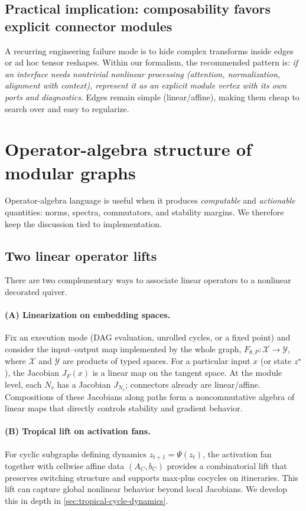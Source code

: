 \documentclass[11pt]{article}
\theoremstyle{definition}
\theoremstyle{plain}
\theoremstyle{remark}
\newcommand{\mc}[1]{\mathcal{#1}}
\begin{document}
\subsection{Practical implication: composability favors explicit connector modules}
A recurring engineering failure mode is to hide complex transforms inside edges or ad hoc tensor reshapes.
Within our formalism, the recommended pattern is:
\emph{if an interface needs nontrivial nonlinear processing (attention, normalization, alignment with context), represent it as an explicit module vertex with its own ports and diagnostics}.
Edges remain simple (linear/affine), making them cheap to search over and easy to regularize.

\newpage

\section{Operator-algebra structure of modular graphs}
\label{sec:operator-algebra}

Operator-algebra language is useful when it produces \emph{computable} and \emph{actionable} quantities: norms, spectra, commutators, and stability margins.
We therefore keep the discussion tied to implementation.

\subsection{Two linear operator lifts}
There are two complementary ways to associate linear operators to a nonlinear decorated quiver.

\paragraph{(A) Linearization on embedding spaces.}
Fix an execution mode (DAG evaluation, unrolled cycles, or a fixed point) and consider the input--output map implemented by the whole graph,
$F_{\theta,P}: \mc{X}\to \mc{Y}$, where $\mc{X}$ and $\mc{Y}$ are products of typed spaces.
For a particular input $x$ (or state $z^\star$), the Jacobian $J_F(x)$ is a linear map on the tangent space.
At the module level, each $N_v$ has a Jacobian $J_{N_v}$; connectors already are linear/affine.
Compositions of these Jacobians along paths form a noncommutative algebra of linear maps that directly controls stability and gradient behavior.

\paragraph{(B) Tropical lift on activation fans.}
For cyclic subgraphs defining dynamics $z_{t+1}=\Psi(z_t)$, the activation fan together with cellwise affine data $(A_C,b_C)$ provides a combinatorial lift that preserves switching structure and supports max-plus cocycles on itineraries.
This lift can capture global nonlinear behavior beyond local Jacobians.
We develop this in depth in \cref{sec:tropical-cycle-dynamics}.
\end{document}
